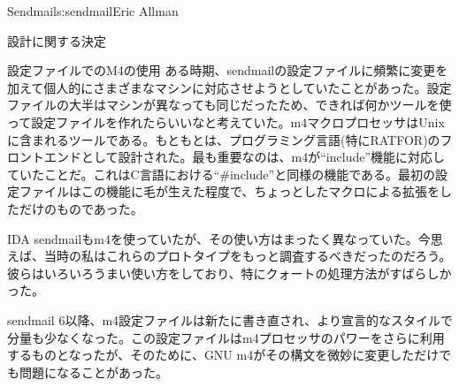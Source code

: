 \begin{aosachapter}{Sendmail}{s:sendmail}{Eric Allman}
\begin{aosasect1}{設計に関する決定}
\begin{aosasect2}{設定ファイルでのM4の使用}
ある時期、sendmailの設定ファイルに頻繁に変更を加えて個人的にさまざまなマシンに対応させようとしていたことがあった。設定ファイルの大半はマシンが異なっても同じだったため、できれば何かツールを使って設定ファイルを作れたらいいなと考えていた。m4マクロプロセッサはUnixに含まれるツールである。もともとは、プログラミング言語(特にRATFOR)のフロントエンドとして設計された。最も重要なのは、m4が``include''機能に対応していたことだ。これはC言語における``\#include''と同様の機能である。最初の設定ファイルはこの機能に毛が生えた程度で、ちょっとしたマクロによる拡張をしただけのものであった。

IDA sendmailもm4を使っていたが、その使い方はまったく異なっていた。今思えば、当時の私はこれらのプロトタイプをもっと調査するべきだったのだろう。彼らはいろいろうまい使い方をしており、特にクォートの処理方法がすばらしかった。

sendmail 6以降、m4設定ファイルは新たに書き直され、より宣言的なスタイルで分量も少なくなった。この設定ファイルはm4プロセッサのパワーをさらに利用するものとなったが、そのために、GNU m4がその構文を微妙に変更しただけでも問題になることがあった。


\end{aosasect2}
\end{aosasect1}
\end{aosachapter}

